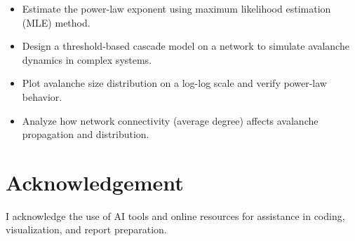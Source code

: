 \documentclass[12pt]{article}
\begin{document}
\begin{itemize}
\item Estimate the power-law exponent using maximum likelihood estimation (MLE) method.
\item Design a threshold-based cascade model on a network to simulate avalanche dynamics in complex systems.
\item Plot avalanche size distribution on a log-log scale and verify power-law behavior.
\item Analyze how network connectivity (average degree) affects avalanche propagation and distribution.
\end{itemize}

\section{Acknowledgement}

I acknowledge the use of AI tools and online resources for assistance in coding, visualization, and report preparation.
\end{document}
